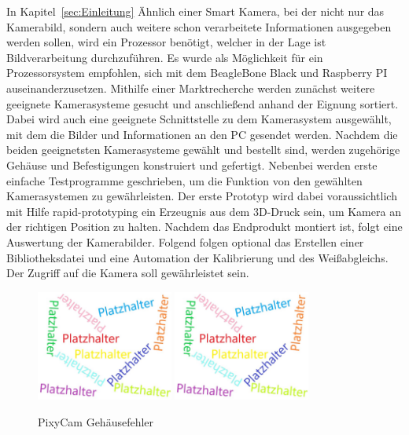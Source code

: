 In Kapitel~\ref{sec:Einleitung} Ähnlich einer Smart Kamera, bei der nicht nur das Kamerabild, sondern auch weitere schon verarbeitete Informationen ausgegeben werden sollen, wird ein Prozessor benötigt, welcher in der Lage ist Bildverarbeitung durchzuführen. Es wurde als Möglichkeit für ein Prozessorsystem empfohlen, sich mit dem BeagleBone Black und Raspberry PI auseinanderzusetzen. Mithilfe einer Marktrecherche werden zunächst weitere geeignete Kamerasysteme gesucht und anschließend anhand der Eignung sortiert. Dabei wird auch eine geeignete Schnittstelle zu dem Kamerasystem ausgewählt, mit dem die Bilder und Informationen an den PC gesendet werden. Nachdem die beiden geeignetsten Kamerasysteme gewählt und bestellt sind, werden zugehörige Gehäuse und Befestigungen konstruiert und gefertigt. Nebenbei werden erste einfache Testprogramme geschrieben, um die Funktion von den gewählten Kamerasystemen zu gewährleisten. Der erste Prototyp wird dabei voraussichtlich mit Hilfe rapid-prototyping ein Erzeugnis aus dem 3D-Druck sein, um Kamera an der richtigen Position zu halten. Nachdem das Endprodukt montiert ist, folgt eine Auswertung der Kamerabilder. Folgend folgen optional das Erstellen einer Bibliotheksdatei und eine Automation der Kalibrierung und des Weißabgleichs. Der Zugriff auf die Kamera soll gewährleistet sein. 

\begin{figure}[htb]
    \centering
    \includegraphics[width=0.4\textwidth]{Abbildungen/Platzhalter.jpg}
    \includegraphics[width=0.4\textwidth]{Abbildungen/Platzhalter.jpg}
    \caption{PixyCam Gehäusefehler}		
    \label{fig:Pixy_Fehler}
\end{figure}

